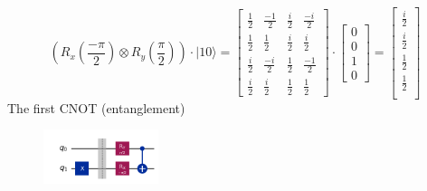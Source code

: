 \documentclass{article}
\begin{document}
\begin{itemize}
    \[
        \left(R_x(\frac{-\pi}{2}) \otimes R_y(\frac{\pi}{2})\right) \cdot |10 \rangle =
        \begin{bmatrix}
            \frac{1}{2} & \frac{-1}{2} & \frac{i}{2} & \frac{-i}{2} \\
            \frac{1}{2} & \frac{1}{2} & \frac{i}{2}  & \frac{i}{2} \\
            \frac{i}{2} & \frac{-i}{2} & \frac{1}{2} & \frac{-1}{2} \\
            \frac{i}{2}  & \frac{i}{2} & \frac{1}{2} & \frac{1}{2} 
        \end{bmatrix}
        \cdot
        \begin{bmatrix}
            0\\
            0\\
            1\\
            0
        \end{bmatrix}
        =
        \begin{bmatrix}
            \frac{i}{2} \\
            \frac{i}{2} \\
            \frac{1}{2} \\
            \frac{1}{2} \\
        \end{bmatrix}
    \]
    The first CNOT (entanglement)
    \begin{figure}[H]
        \centering
        \includegraphics[width=0.3\textwidth, height=0.15\textheight]{1cnot.png}
        

\end{figure}
\end{itemize}
\end{document}
